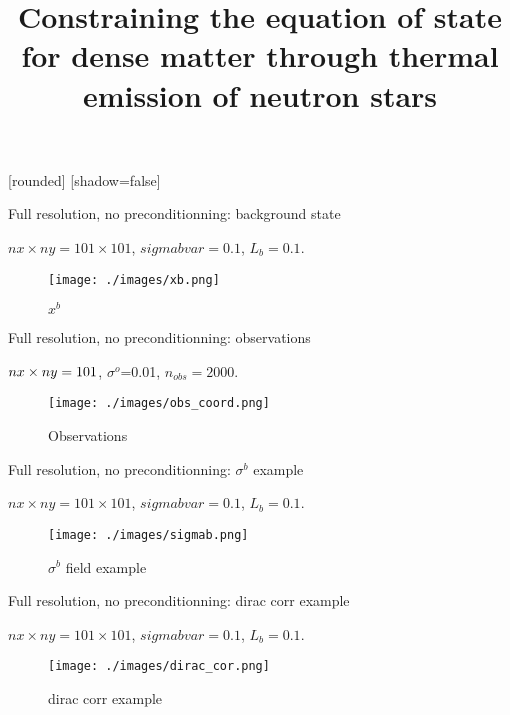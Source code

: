 \documentclass[francais]{beamer}
\title[Nicolas Baillot d'Etivaux]{Constraining the equation of state for dense matter through thermal emission of neutron stars}
\begin{document}
[rounded]%
[shadow=false]


\begin{frame}{Full resolution, no preconditionning: background state}
\begin{center}
$nx\times ny=101 \times 101$, $sigmabvar=0.1$, $L_b=0.1$.\\
\begin{figure}
 \texttt{[image: ./images/xb.png]}
 \caption{$x^b$}
\end{figure} 
\end{center}
\end{frame}


\begin{frame}{Full resolution, no preconditionning: observations}
\begin{center}
$nx\times ny=101 \time 101$, $\sigma^o$=0.01, $n_{obs}=2000$.\\
\begin{figure}
 \texttt{[image: ./images/obs\_coord.png]}
 \caption{Observations}
\end{figure} 
\end{center}
\end{frame}

\begin{frame}{Full resolution, no preconditionning: $\sigma^b$ example}
\begin{center}
$nx\times ny=101 \times 101$, $sigmabvar=0.1$, $L_b=0.1$.\\
\begin{figure}
 \texttt{[image: ./images/sigmab.png]}
 \caption{$\sigma^b$ field example}
\end{figure} 
\end{center}
\end{frame}

\begin{frame}{Full resolution, no preconditionning: dirac corr example}
\begin{center}
$nx\times ny=101 \times 101$, $sigmabvar=0.1$, $L_b=0.1$.\\
\begin{figure}
 \texttt{[image: ./images/dirac\_cor.png]}
 \caption{dirac corr example}
\end{figure} 
\end{center}
\end{frame}
\end{document}
